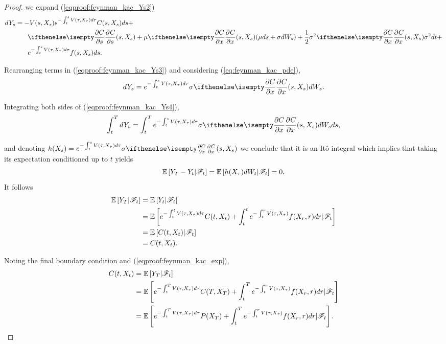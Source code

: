 \documentclass[../TGMAFFIRO.tex]{subfiles}
\begin{document}
\begin{proof}
we expand (\ref{eqproof:feynman_kac_Ys2}) 
\begin{align}
  dY_s &= -V(s, X_s)e^{-\int_t^s V(\tau, X_\tau) d\tau}C(s, X_s) ds + \nonumber \\
   &\phantom{{}=1} \partialwrt{C}{s}{(s, X_s)} + \mu\partialwrt{C}{x}{(s, X_s)}(\mu ds + \sigma dW_s) + \frac{1}{2}\sigma^2\partialwrt{C}{x}{(s, X_s)} \sigma^2 dt\nonumber + \\
   &\phantom{{}=1} e^{-\int_t^s V(\tau, X_\tau)d\tau}f(s, X_s) ds\label{eqproof:feynman_kac_Ys3}.
\end{align}

Rearranging terms in (\ref{eqproof:feynman_kac_Ys3}) and considering (\ref{eq:feynman_kac_pde}),
\begin{equation}
	dY_s =e^{-\int_t^s V(\tau, X_\tau) d\tau} \sigma \partialwrt{C}{x}{(s, X_s)}dW_s \label{eqproof:feynman_kac_Ys4}.
\end{equation}

Integrating both sides of (\ref{eqproof:feynman_kac_Ys4}),
\begin{equation}
  \int_t^T dY_s =\int_t^T e^{-\int_t^s V(\tau, X_\tau) d\tau} \sigma \partialwrt{C}{x}{(s, X_s)}dW_s ds,
\end{equation}

and denoting $h(X_s) = e^{-\int_t^s V(\tau, X_\tau) d\tau} \sigma \partialwrt{C}{x}{(s, X_s)}$ we conclude that it is an It\^o integral which implies that taking its expectation conditioned up to $t$ yields
\begin{equation}
  \mathbb{E}\left[Y_T - Y_t|\mathscr{F}_t\right] = \mathbb{E}\left[h(X_\tau) dW_t|\mathscr{F}_t\right] = 0.
\end{equation}
It follows
\begin{align}
	\mathbb{E}\left[Y_T|\mathscr{F}_t\right] &= \mathbb{E}\left[Y_t|\mathscr{F}_t\right]\nonumber\\
	&= \mathbb{E}\left[e^{-\int_t^t V(\tau, X_\tau) d\tau}C(t, X_t) + \int_t^t e^{-\int_t^rV(\tau, X_\tau)}f(X_r, r) dr|\mathscr{F}_t\right]\nonumber\\
	&= \mathbb{E}\left[C(t, X_t)|\mathscr{F}_t\right]\nonumber\\
	&= C(t, X_t).\label{eqproof:feynman_kac_exp}
\end{align}

Noting the final boundary condition and (\ref{eqproof:feynman_kac_exp}),
\begin{align}
  C(t, X_t) &= \mathbb{E}\left[Y_T|\mathscr{F}_t\right] \nonumber\\
  	&= \mathbb{E}\left[e^{-\int_t^T V(\tau, X_\tau) d\tau}C(T, X_T) + \int_t^T e^{-\int_t^rV(\tau, X_\tau)}f(X_r, r) dr|\mathscr{F}_t\right]\nonumber\\
  	&= \mathbb{E}\left[e^{-\int_t^T V(\tau, X_\tau) d\tau}P(X_T) + \int_t^T e^{-\int_t^rV(\tau, X_\tau)}f(X_r, r) dr|\mathscr{F}_t\right]\nonumber.
\end{align}

\end{proof}
\end{document}
